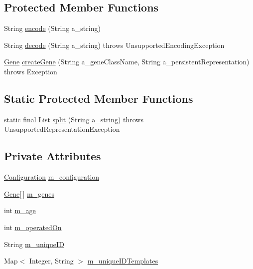 \subsection*{Protected Member Functions}
\begin{DoxyCompactItemize}
\item 
String \hyperlink{classorg_1_1jgap_1_1_base_chromosome_a2c339c9c70184d1a911878e1be39dc82}{encode} (String a\-\_\-string)
\item 
String \hyperlink{classorg_1_1jgap_1_1_base_chromosome_a0ccfa10730437df1a23322886a6949e7}{decode} (String a\-\_\-string)  throws Unsupported\-Encoding\-Exception 
\item 
\hyperlink{interfaceorg_1_1jgap_1_1_gene}{Gene} \hyperlink{classorg_1_1jgap_1_1_base_chromosome_a61d504512312fdc761af87fe0f3ca36d}{create\-Gene} (String a\-\_\-gene\-Class\-Name, String a\-\_\-persistent\-Representation)  throws Exception 
\end{DoxyCompactItemize}
\subsection*{Static Protected Member Functions}
\begin{DoxyCompactItemize}
\item 
static final List \hyperlink{classorg_1_1jgap_1_1_base_chromosome_a9237b2c8d40b9d466d5f68792ba04036}{split} (String a\-\_\-string)  throws Unsupported\-Representation\-Exception 
\end{DoxyCompactItemize}
\subsection*{Private Attributes}
\begin{DoxyCompactItemize}
\item 
\hyperlink{classorg_1_1jgap_1_1_configuration}{Configuration} \hyperlink{classorg_1_1jgap_1_1_base_chromosome_a2303f591b284ec1ad116c135806af7c3}{m\-\_\-configuration}
\item 
\hyperlink{interfaceorg_1_1jgap_1_1_gene}{Gene}\mbox{[}$\,$\mbox{]} \hyperlink{classorg_1_1jgap_1_1_base_chromosome_ac1d06474d7d21f73fd602cee8f0d50b4}{m\-\_\-genes}
\item 
int \hyperlink{classorg_1_1jgap_1_1_base_chromosome_a8208f36f8feb650c1e72edf2244e44f3}{m\-\_\-age}
\item 
int \hyperlink{classorg_1_1jgap_1_1_base_chromosome_af0a5c64437918ed0e28233f39fa60a30}{m\-\_\-operated\-On}
\item 
String \hyperlink{classorg_1_1jgap_1_1_base_chromosome_a04dcfa7a4ba552f754ab440b21ebe558}{m\-\_\-unique\-I\-D}
\item 
Map$<$ Integer, String $>$ \hyperlink{classorg_1_1jgap_1_1_base_chromosome_ae74c4eae0fc849d8210ec100bbb01042}{m\-\_\-unique\-I\-D\-Templates}
\end{DoxyCompactItemize}
